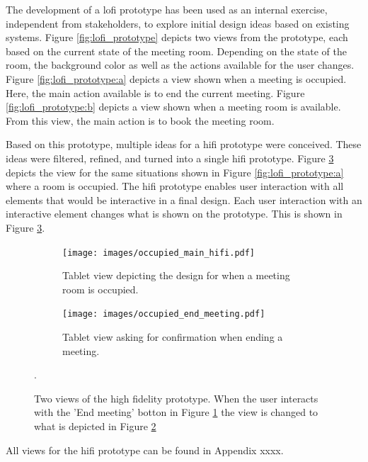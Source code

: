 The development of a lofi prototype has been used as an internal exercise, independent from stakeholders, to explore initial design ideas based on existing systems.
Figure \ref{fig:lofi_prototype} depicts two views from the prototype, each based on the current state of the meeting room.
Depending on the state of the room, the background color as well as the actions available for the user changes.
Figure \ref{fig:lofi_prototype:a} depicts a view shown when a meeting is occupied.
Here, the main action available is to end the current meeting.
Figure \ref{fig:lofi_prototype:b} depicts a view shown when a meeting room is available.
From this view, the main action is to book the meeting room.

Based on this prototype, multiple ideas for a hifi prototype were conceived.
These ideas were filtered, refined, and turned into a single hifi prototype.
Figure \ref{fig:hifi_prototype_interaction} depicts the view for the same situations shown in Figure \ref{fig:lofi_prototype:a} where a room is occupied.
The hifi prototype enables user interaction with all elements that would be interactive in a final design.
Each user interaction with an interactive element changes what is shown on the prototype. 
This is shown in Figure \ref{fig:hifi_prototype_interaction}.

\begin{figure}
    \centering
    \begin{subfigure}[b]{0.49\textwidth}
        \centering
        \texttt{[image: images/occupied\_main\_hifi.pdf]}
        \caption{Tablet view depicting the design for when a meeting room is occupied.}
        \label{fig:hifi_prototype:a}
    \end{subfigure}
    \begin{subfigure}[b]{0.49\textwidth}
        \centering
        \texttt{[image: images/occupied\_end\_meeting.pdf]}
        \caption{Tablet view asking for confirmation when ending a meeting.}
        \label{fig:hifi_prototype:b}
    \end{subfigure}
    \caption{Two views of the high fidelity prototype. When the user interacts with the 'End meeting' botton in Figure \ref{fig:hifi_prototype:a} the view is changed to what is depicted in Figure \ref{fig:hifi_prototype:b}}.
    \label{fig:hifi_prototype_interaction}
\end{figure}

All views for the hifi prototype can be found in Appendix xxxx. 